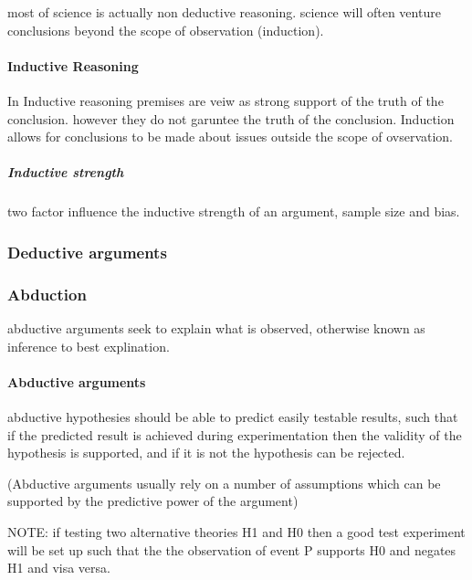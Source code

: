 \documentclass[]{article}
\let\oldparagraph\paragraph
\renewcommand{\paragraph}[1]{\oldparagraph{#1}\mbox{}}
\let\oldsubparagraph\subparagraph
\renewcommand{\subparagraph}[1]{\oldsubparagraph{#1}\mbox{}}
\begin{document}
most of science is actually non deductive reasoning. science will often
venture conclusions beyond the scope of observation (induction).

\hypertarget{inductive-reasoning}{%
\paragraph{Inductive Reasoning}\label{inductive-reasoning}}

In Inductive reasoning premises are veiw as strong support of the truth
of the conclusion. however they do not garuntee the truth of the
conclusion. Induction allows for conclusions to be made about issues
outside the scope of ovservation.

\hypertarget{inductive-strength}{%
\subparagraph{Inductive strength}\label{inductive-strength}}

two factor influence the inductive strength of an argument, sample size
and bias.

\hypertarget{deductive-arguments-1}{%
\subsubsection{Deductive arguments}\label{deductive-arguments-1}}

\hypertarget{abduction}{%
\subsubsection{Abduction}\label{abduction}}

abductive arguments seek to explain what is observed, otherwise known as
inference to best explination.

\hypertarget{abductive-arguments}{%
\paragraph{Abductive arguments}\label{abductive-arguments}}

abductive hypothesies should be able to predict easily testable results,
such that if the predicted result is achieved during experimentation
then the validity of the hypothesis is supported, and if it is not the
hypothesis can be rejected.

(Abductive arguments usually rely on a number of assumptions which can
be supported by the predictive power of the argument)

NOTE: if testing two alternative theories H1 and H0 then a good test
experiment will be set up such that the the observation of event P
supports H0 and negates H1 and visa versa.
\end{document}
